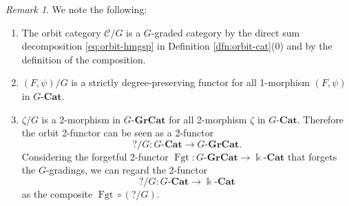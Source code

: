 \documentclass{surv-l}
\numberwithin{equation}{chapter}
\numberwithin{figure}{chapter}
\theoremstyle{plain}
\theoremstyle{definition}
\theoremstyle{remark}
\newtheorem{rmk}[thm]{Remark}
\newcommand{\kCat}{\Bbbk\text{-}\mathbf{Cat}}
\newcommand{\GCat}{G\text{-}\mathbf{Cat}}
\newcommand{\GGrCat}{G\text{-}\mathbf{GrCat}}
\DeclareMathOperator{\Fgt}{Fgt}
\begin{document}
\begin{rmk}\label{rmk:orbit-graded}
We note the following:
\begin{enumerate}
\item The orbit category ${\mathcal{C}}/G$ is a $G$-graded category by
the direct sum decomposition \eqref{eq:orbit-hmgsp} in
Definition \ref{dfn:orbit-cat}(0) and by the definition of the composition.
\item $(F, \psi)/G$ is a strictly degree-preserving functor for all 1-morphism $(F, \psi)$ in
$\GCat$.
\item $\zeta/G$ is a 2-morphism in $\GGrCat$ for all
2-morphism $\zeta$ in $\GCat$.
Therefore the orbit 2-functor can be seen as a 2-functor
 \begin{equation*}
 ?/G \colon \GCat \to \GGrCat.
 \end{equation*}
 Considering the forgetful 2-functor $\Fgt \colon \GGrCat \to \kCat$ that forgets the $G$-gradings,
 we can regard the 2-functor
  \begin{equation*}
 ?/G \colon \GCat \to \kCat
 \end{equation*}
 as the composite $\Fgt \circ (?/G)$.
\end{enumerate}
\end{rmk}
\end{document}
